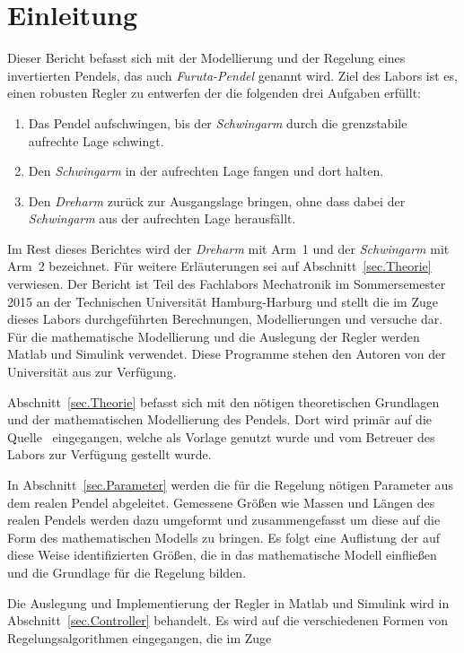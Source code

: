 \section{Einleitung}
\label{sec.Einleitung}

Dieser Bericht befasst sich mit der Modellierung und der Regelung eines invertierten Pendels, das auch \emph{Furuta-Pendel} genannt wird. 
Ziel des Labors ist es, einen robusten Regler zu entwerfen der die folgenden drei Aufgaben erfüllt:
\begin{enumerate}
	\item Das Pendel aufschwingen, bis der \emph{Schwingarm} durch die grenzstabile aufrechte Lage schwingt.
	\item Den \emph{Schwingarm} in der aufrechten Lage fangen und dort halten.
	\item Den \emph{Dreharm} zurück zur Ausgangslage bringen, ohne dass dabei der \emph{Schwingarm} aus der aufrechten Lage herausfällt.
\end{enumerate}
Im Rest dieses Berichtes wird der \emph{Dreharm} mit Arm~1 und der \emph{Schwingarm} mit Arm~2 bezeichnet.
Für weitere Erläuterungen sei auf Abschnitt~\ref{sec.Theorie} verwiesen.
Der Bericht ist Teil des Fachlabors Mechatronik im Sommersemester 2015 an der Technischen Universität Hamburg-Harburg und stellt die im Zuge dieses Labors durchgeführten Berechnungen, Modellierungen und versuche dar. 
Für die mathematische Modellierung und die Auslegung der Regler werden Matlab und Simulink verwendet.
Diese Programme stehen den Autoren von der Universität aus zur Verfügung.

Abschnitt~\ref{sec.Theorie} befasst sich mit den nötigen theoretischen Grundlagen und der mathematischen Modellierung des Pendels.
Dort wird primär auf die Quelle~\citep{Cazzolato.2011} eingegangen, welche als Vorlage genutzt wurde und vom Betreuer des Labors zur Verfügung gestellt wurde.

In Abschnitt~\ref{sec.Parameter} werden die für die Regelung nötigen Parameter aus dem realen Pendel abgeleitet. 
Gemessene Größen wie Massen und Längen des realen Pendels werden dazu umgeformt und zusammengefasst um diese auf die Form des mathematischen Modells zu bringen.
Es folgt eine Auflistung der auf diese Weise identifizierten Größen, die in das mathematische Modell einfließen und die Grundlage für die Regelung bilden.

Die Auslegung und Implementierung der Regler in Matlab und Simulink wird in Abschnitt~\ref{sec.Controller} behandelt.
Es wird auf die verschiedenen Formen von Regelungsalgorithmen eingegangen, die im Zuge 

